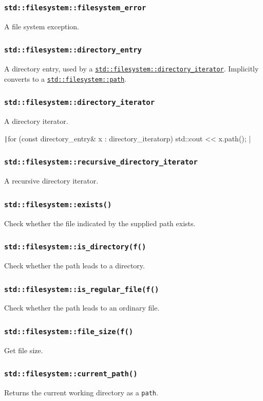 \documentclass[table, xcdraw]{article}%
\begin{document}
\subsubsection{\texttt{std::filesystem::filesystem_error}}

A file system exception.

\subsubsection{\texttt{std::filesystem::directory_entry}}

A directory entry, used by a \hyperref[directory_iterator]{\texttt{std::filesystem::directory_iterator}}. Implicitly converts to a \hyperref[path]{\texttt{std::filesystem::path}}.

\subsubsection{\texttt{std::filesystem::directory_iterator}} \label{directory_iterator}

A directory iterator.

\texttt|for (const directory_entry& x : directory_iterator{p}) { std::cout << x.path(); }|

\subsubsection{\texttt{std::filesystem::recursive_directory_iterator}}

A recursive directory iterator.

\subsubsection{\texttt{std::filesystem::exists()}}

Check whether the file indicated by the supplied path exists.

\subsubsection{\texttt{std::filesystem::is_directory(f()}}

Check whether the path leads to a directory.

\subsubsection{\texttt{std::filesystem::is_regular_file(f()}}

Check whether the path leads to an ordinary file.

\subsubsection{\texttt{std::filesystem::file_size(f()}}

Get file size.

\subsubsection{\texttt{std::filesystem::current_path()}}

Returns the current working directory as a \texttt{path}.
\end{document}
